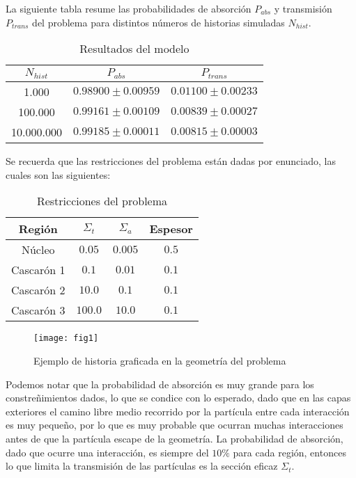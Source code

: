 
La siguiente tabla resume las probabilidades de absorción $P_{abs}$ y transmisión $P_{trans}$ del problema para distintos números de historias simuladas $N_{hist}$. 

\begin{table}[h!]
	\centering
	\begin{tabular}{|c|c|c|}
		\hline
		$N_{hist}$ & $P_{abs}$        & $P_{trans}$      \\ \hline
		1.000           & $0.98900 \pm 0.00959$ & $0.01100 \pm 0.00233$ \\ \hline
		100.000         & $0.99161 \pm 0.00109$ & $0.00839 \pm 0.00027$ \\ \hline
		10.000.000      & $0.99185 \pm 0.00011$ & $0.00815 \pm 0.00003$ \\ \hline
	\end{tabular}
	\caption{Resultados del modelo}
\end{table}

Se recuerda que las restricciones del problema están dadas por enunciado, las cuales son las siguientes:


\begin{table}[h!]
	\centering
	\begin{tabular}{|c|c|c|c|}
		\hline
		Región & $\Sigma_t$ & $\Sigma_a$ & Espesor      \\ \hline
		Núcleo & $0.05$ & $0.005$ & $0.5$ \\ \hline
		Cascarón 1 & $0.1$ & $0.01$ & $0.1$ \\ \hline
		Cascarón 2 & $10.0$ & $0.1$ & $0.1$ \\ \hline
		Cascarón 3 & $100.0$ & $10.0$ & $0.1$ \\ \hline
	\end{tabular}
	\caption{Restricciones del problema}
\end{table}

\begin{figure}[h!]
	\centering
	\texttt{[image: fig1]}
	\caption{Ejemplo de historia graficada en la geometría del problema}
\end{figure}


Podemos notar que la probabilidad de absorción es muy grande para los constreñimientos dados, lo que se condice con lo esperado, dado que en las capas exteriores el camino libre medio recorrido por la partícula entre cada interacción es muy pequeño, por lo que es muy probable que ocurran muchas interacciones antes de que la partícula escape de la geometría. La probabilidad de absorción, dado que ocurre una interacción, es siempre del $10\%$ para cada región, entonces lo que limita la transmisión de las partículas es la sección eficaz $\Sigma_t$.\\


